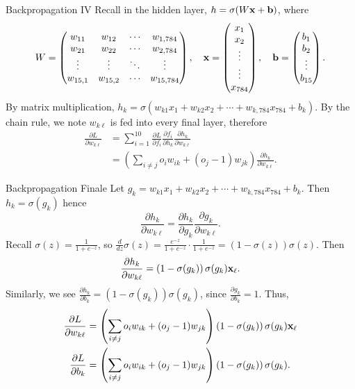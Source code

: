 \documentclass[xcolor=dvipsnames, fontsize=11pt, %
pagesize, %
parskip=half-, t]{beamer}
\begin{document}
\begin{frame}{Backpropagation IV}
Recall in the hidden layer, $h=\sigma(W\bold{x}+\bold{b})$, where  $$W=\begin{pmatrix} w_{11} & w_{12}  & \cdots &  w_{1,784} \\  w_{21} & w_{22} & \cdots & w_{2,784} \\  \vdots & \vdots  & \ddots & \vdots \\  w_{15, 1} & w_{15, 2}  & \cdots & w_{15, 784} \end{pmatrix}, \quad \bold{x}=\begin{pmatrix} x_1 \\ x_2 \\ \vdots  \\ \vdots \\ x_{784} \end{pmatrix}, \quad \bold{b}=\begin{pmatrix} b_1 \\ b_2 \\ \vdots \\ b_{15} \end{pmatrix}.$$ 
By matrix multiplication, $h_k=\sigma(w_{k1}x_1+w_{k2}x_2+\cdots+w_{k,784}x_{784}+b_k)$.  By the chain rule, we note $w_{k\ell}$ is fed into every final layer, therefore \begin{align*} \frac{\partial L}{\partial w_{k\ell}}&=\sum_{i=1}^{10}\frac{\partial L}{\partial f_i}\frac{\partial f_i}{\partial h_k}\frac{\partial h_k}{\partial w_{k\ell}} \\ &= \left(\sum_{i\neq j}o_iw_{ik}+(o_j-1)w_{jk}\right)\frac{\partial h_k}{\partial w_{k\ell}}.\end{align*}
\end{frame}
\begin{frame}{Backpropagation Finale}
Let $g_k=w_{k1}x_1+w_{k2}x_2+\cdots+w_{k,784}x_{784}+b_k$. Then $h_k=\sigma(g_k)$ hence $$\frac{\partial h_k}{\partial w_{k\ell}}=\frac{\partial h_k}{\partial g_k}\frac{\partial g_k}{\partial w_{k\ell}}.$$ 
Recall $\sigma(z)=\frac{1}{1+e^{-z}}$, so $\frac{d}{dz}\sigma(z)=\frac{e^{-z}}{1+e^{-z}}\cdot \frac{1}{1+e^{-z}}=\left(1-\sigma(z)\right)\sigma(z).$  Then $$\frac{\partial h_k}{\partial w_{k\ell}}=\left(1-\sigma(g_k)\right)\sigma(g_k)\bold{x}_{\ell}.$$  Similarly, we see $\frac{\partial h_k}{\partial b_k}=\left(1-\sigma(g_k)\right)\sigma(g_k)$, since $\frac{\partial g_k}{\partial b_k}=1$.  Thus, \begin{align*} \frac{\partial L}{\partial w_{k\ell}}&=\left(\sum_{i\neq j}o_iw_{ik}+(o_j-1)w_{jk}\right)\left(1-\sigma(g_k)\right)\sigma(g_k)\bold{x}_{\ell} \\ \frac{\partial L}{\partial b_k}&=\left(\sum_{i\neq j}o_iw_{ik}+(o_j-1)w_{jk}\right)\left(1-\sigma(g_k)\right)\sigma(g_k). \end{align*}
\end{frame}
\end{document}
